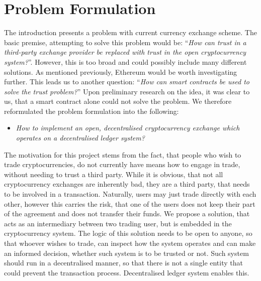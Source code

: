\section{Problem Formulation}\label{sec:problem-formulation}
% 
The introduction presents a problem with current currency exchange scheme. The basic premise, attempting to solve this problem would be: ``\textit{How can trust in a third-party exchange provider be replaced with trust in the open cryptocurrency system?}''. However, this is too broad and could possibly include many different solutions. As mentioned previously, Ethereum would be worth investigating further. This leads us to another question: ``\textit{How can smart contracts be used to solve the trust problem?}'' Upon preliminary research on the idea, it was clear to us, that a smart contract alone could not solve the problem. We therefore reformulated the problem formulation into the following:

\begin{itemize}
    \item \textit{How to implement an open, decentralised cryptocurrency exchange which operates on a decentralised ledger system?}
\end{itemize}

\noindent The motivation for this project stems from the fact, that people who wish to trade cryptocurrencies, do not currently have means how to engage in trade, without needing to trust a third party. While it is obvious, that not all cryptocurrency exchanges are inherently bad, they are a third party, that needs to be involved in a transaction. Naturally, users may just trade directly with each other, however this carries the risk, that one of the users does not keep their part of the agreement and does not transfer their funds. We propose a solution, that acts as an intermediary between two trading user, but is embedded in the cryptocurrency system. The logic of this solution needs to be open to anyone, so that whoever wishes to trade, can inspect how the system operates and can make an informed decision, whether such system is to be trusted or not. Such system should run in a decentralised manner, so that there is not a single entity that could prevent the transaction process. Decentralised ledger system enables this.
